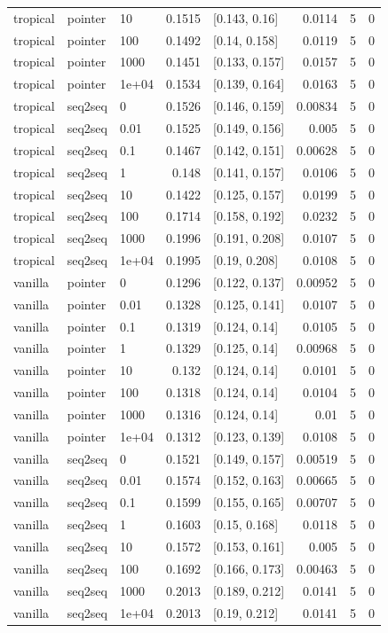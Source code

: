 \documentclass[10pt]{article}
\begin{document}
{\begin{longtable}{lllrlrrr}
tropical & pointer & 10 & 0.1515 & [0.143, 0.16] & 0.0114 & 5 & 0\\
tropical & pointer & 100 & 0.1492 & [0.14, 0.158] & 0.0119 & 5 & 0\\
tropical & pointer & 1000 & 0.1451 & [0.133, 0.157] & 0.0157 & 5 & 0\\
tropical & pointer & 1e+04 & 0.1534 & [0.139, 0.164] & 0.0163 & 5 & 0\\
tropical & seq2seq & 0 & 0.1526 & [0.146, 0.159] & 0.00834 & 5 & 0\\
tropical & seq2seq & 0.01 & 0.1525 & [0.149, 0.156] & 0.005 & 5 & 0\\
tropical & seq2seq & 0.1 & 0.1467 & [0.142, 0.151] & 0.00628 & 5 & 0\\
tropical & seq2seq & 1 & 0.148 & [0.141, 0.157] & 0.0106 & 5 & 0\\
tropical & seq2seq & 10 & 0.1422 & [0.125, 0.157] & 0.0199 & 5 & 0\\
tropical & seq2seq & 100 & 0.1714 & [0.158, 0.192] & 0.0232 & 5 & 0\\
tropical & seq2seq & 1000 & 0.1996 & [0.191, 0.208] & 0.0107 & 5 & 0\\
tropical & seq2seq & 1e+04 & 0.1995 & [0.19, 0.208] & 0.0108 & 5 & 0\\
vanilla & pointer & 0 & 0.1296 & [0.122, 0.137] & 0.00952 & 5 & 0\\
vanilla & pointer & 0.01 & 0.1328 & [0.125, 0.141] & 0.0107 & 5 & 0\\
vanilla & pointer & 0.1 & 0.1319 & [0.124, 0.14] & 0.0105 & 5 & 0\\
vanilla & pointer & 1 & 0.1329 & [0.125, 0.14] & 0.00968 & 5 & 0\\
vanilla & pointer & 10 & 0.132 & [0.124, 0.14] & 0.0101 & 5 & 0\\
vanilla & pointer & 100 & 0.1318 & [0.124, 0.14] & 0.0104 & 5 & 0\\
vanilla & pointer & 1000 & 0.1316 & [0.124, 0.14] & 0.01 & 5 & 0\\
vanilla & pointer & 1e+04 & 0.1312 & [0.123, 0.139] & 0.0108 & 5 & 0\\
vanilla & seq2seq & 0 & 0.1521 & [0.149, 0.157] & 0.00519 & 5 & 0\\
vanilla & seq2seq & 0.01 & 0.1574 & [0.152, 0.163] & 0.00665 & 5 & 0\\
vanilla & seq2seq & 0.1 & 0.1599 & [0.155, 0.165] & 0.00707 & 5 & 0\\
vanilla & seq2seq & 1 & 0.1603 & [0.15, 0.168] & 0.0118 & 5 & 0\\
vanilla & seq2seq & 10 & 0.1572 & [0.153, 0.161] & 0.005 & 5 & 0\\
vanilla & seq2seq & 100 & 0.1692 & [0.166, 0.173] & 0.00463 & 5 & 0\\
vanilla & seq2seq & 1000 & 0.2013 & [0.189, 0.212] & 0.0141 & 5 & 0\\
vanilla & seq2seq & 1e+04 & 0.2013 & [0.19, 0.212] & 0.0141 & 5 & 0\\
\bottomrule
\end{longtable}
}
\end{document}
